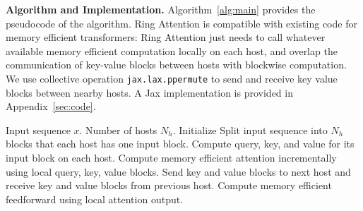 \documentclass{article}
\newcommand{\ie}{\textit{i}.\textit{e}.}
\newcommand{\ours}{{Ring Attention}\xspace}
\begin{document}
\begin{table}[!tb]
\centering
\caption{Minimal sequence length needed on each device. Interconnect Bandwidth is the unidirectional bandwidth between hosts, \ie, NVLink / InfiniBand bandwidth between GPUs and ICI bandwidth between TPUs.
The minimal block size required $c = \text{FLOPS} / \text{Bandwidth}$, and minimal sequence length $s = 6c$.
}
\label{tab:seqlen}
\vspace{-0.5em}
\end{table}



\textbf{Algorithm and Implementation.}
Algorithm~\ref{alg:main} provides the pseudocode of the algorithm.
\ours is compatible with existing code for memory efficient transformers:
\ours just needs to call whatever available memory efficient computation locally on each host, and overlap the communication of key-value blocks between hosts with blockwise computation. We use collective operation \texttt{jax.lax.ppermute} to send and receive key value blocks between nearby hosts.
A Jax implementation is provided in Appendix~\ref{sec:code}.

\begin{algorithm}[!tb]
\caption{Reducing Transformers Memory Cost with \ours.}
\label{alg:main}
\begin{algorithmic}
    Input sequence $x$. Number of hosts $N_h$.
   \STATE Initialize
   \STATE Split input sequence into $N_h$ blocks that each host has one input block.
   \STATE Compute query, key, and value for its input block on each host.
   \STATE Compute memory efficient attention incrementally using local query, key, value blocks.
   \STATE Send key and value blocks to next host and receive key and value blocks from previous host.
   \ENDFOR
   \ENDFOR
   \STATE Compute memory efficient feedforward using local attention output.
   \ENDFOR
   \ENDFOR
\end{algorithmic}
\end{algorithm}
\end{document}
